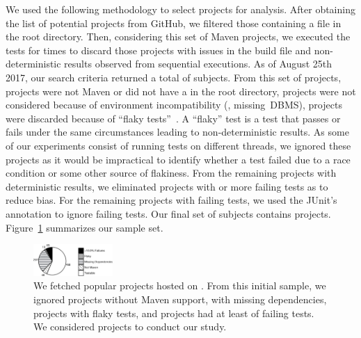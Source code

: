 We used the following methodology to select projects for
analysis. After obtaining the list of potential projects from GitHub, we
filtered those
containing a \pomf{} file in the root directory.
Then, considering this set of Maven projects, we
executed the tests for \SubjectsReruns{} times to discard those projects with
issues
in the build file and non-deterministic results observed from sequential
executions.
As of August 25th 2017, our search criteria returned a total of
\SubjectsGithub{}
subjects.
From this set of projects,
\SubjectsGithubNotMaven{} projects were not Maven or did not have a
\pomf{} in the root directory, 
\SubjectsGithubNotTestable{} projects were not considered because of
environment incompatibility
(\eg, missing~DBMS),
\SubjectsGithubFlaky{} projects were discarded because of
``flaky tests''~\cite{luo-etal-fse2014}. A ``flaky'' test is a test that passes
or fails under
the same circumstances leading to non-deterministic results.
As some of our experiments consist of running tests on different
threads, we ignored these projects as it would be impractical
to identify whether a test failed due to a race condition or some
other source of flakiness.
From the remaining \SubjectsGithubConsistant{} projects with
deterministic results, we eliminated \SubjectsGithubTooManyFailures{}
projects with \SuiteFailingThreshold{} or more failing tests as to
reduce bias. For the
remaining projects with failing tests, we used the JUnit's
 annotation to ignore failing tests.
Our final set of subjects contains \numSubjs{} projects.
Figure~\ref{fig:subjects} summarizes our sample set.

\begin{figure}[ht]
  \vspace{-5mm}
  \centering
  \includegraphics[width=0.27\textwidth]{results/piechart-subjs.pdf}
  \caption{\label{fig:subjects}We fetched \SubjectsGithub{} popular projects
  hosted on \github{}. From this initial sample, we ignored
  \SubjectsGithubNotMaven{} projects without Maven support,
  \SubjectsGithubNotTestable{} with missing dependencies,
  \SubjectsGithubFlaky{} projects with flaky tests, and
  \SubjectsGithubTooManyFailures{} projects had at least
  \SuiteFailingThreshold{} of failing tests. We considered
  \numSubjs{} projects to conduct our study.}
\end{figure}

